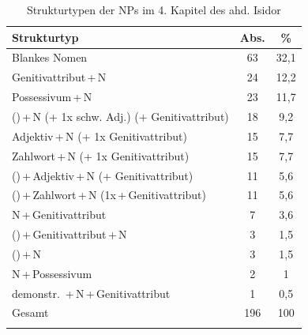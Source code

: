 \begin{table}
\centering
\caption{Strukturtypen der NPs im 4. Kapitel des ahd. Isidor \\ \parencite{Flick2018}}
\label{NP-Flick}
\begin{tabular}{lS[table-format=2.0]S[table-format=2.1]}
\lsptoprule
{Strukturtyp}                                   & {Abs.} & {\%}  \\ \midrule
Blankes Nomen                                          & 63            & 32,1         \\
Genitivattribut\,+\,N                                    & 24            & 12,2         \\
Possessivum\,+\,N                                          & 23            & 11,7         \\
 ()\,+\,N (+ 1x schw. Adj.) (+ Genitivattribut) & 18            & 9,2          \\
Adjektiv\,+\,N (+ 1x Genitivattribut)                    & 15            & 7,7          \\
Zahlwort\,+\,N (+ 1x Genitivattribut)                    & 15            & 7,7          \\
 ()\,+\,Adjektiv\,+\,N (+ Genitivattribut)        & 11            & 5,6          \\
 ()\,+\,Zahlwort\,+\,N (1x\,+\,Genitivattribut)     & 11            & 5,6          \\
N\,+\,Genitivattribut                                    & 7             & 3,6          \\
 ()\,+\,Genitivattribut\,+\,N                     & 3             & 1,5          \\
 ()\,+\,N                                     & 3             & 1,5          \\
N\,+\,Possessivum                                          & 2             & 1            \\
demonstr. \,+\,N\,+\,Genitivattribut                   & 1             & 0,5          \\\midrule
{Gesamt}                                        & {196}  & {100} \\ \lspbottomrule
\end{tabular}
\end{table}

